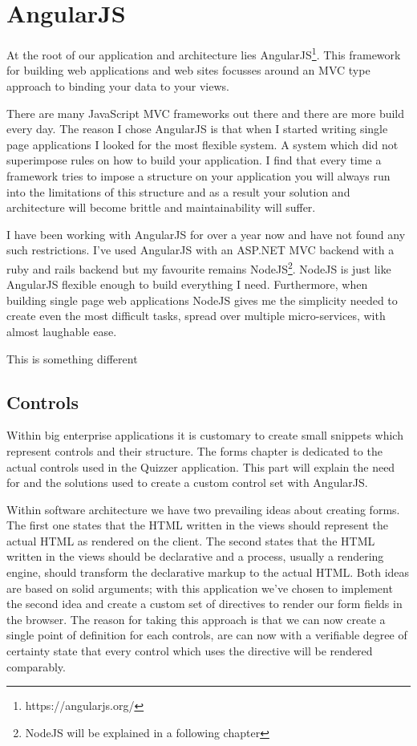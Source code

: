 \documentclass{article}
\begin{document}
\section{AngularJS}
At the root of our application and architecture lies AngularJS\footnote{https://angularjs.org/}. This framework for building web applications and web sites focusses around an MVC type approach to binding your data to your views. 

There are many JavaScript MVC frameworks out there and there are more build every day. The reason I chose AngularJS is that when I started writing single page applications I looked for the most flexible system. A system which did not superimpose rules on how to build your application. I find that every time a framework tries to impose a structure on your application you will always run into the limitations of this structure and as a result your solution and architecture will become brittle and maintainability will suffer. 

I have been working with AngularJS for over a year now and have not found any such restrictions. I’ve used AngularJS with an ASP.NET MVC backend with a ruby and rails backend but my favourite remains NodeJS\footnote{NodeJS will be explained in a following chapter}.  NodeJS is just like AngularJS flexible enough to build everything I need. Furthermore, when building single page web applications NodeJS gives me the simplicity needed to create even the most difficult tasks, spread over multiple micro-services, with almost laughable ease.

\bigskip
This is something different

\subsection{Controls}
Within big enterprise applications it is customary to create small snippets which represent controls and their structure. The forms chapter is dedicated to the actual controls used in the Quizzer application. This part will explain the need for and the solutions used to create a custom control set with AngularJS.

Within software architecture we have two prevailing ideas about creating forms. The first one states that the HTML written in the views should represent the actual HTML as rendered on the client. The second states that the HTML written in the views should be declarative and a process, usually a rendering engine, should transform the declarative markup to the actual HTML. Both ideas are based on solid arguments; with this application we've chosen to implement the second idea and create a custom set of directives to render our form fields in the browser. The reason for taking this approach is that we can now create a single point of definition for each controls, are can now with a verifiable degree of certainty state that every control which uses the directive will be rendered comparably. 

\pagebreak
\end{document}
